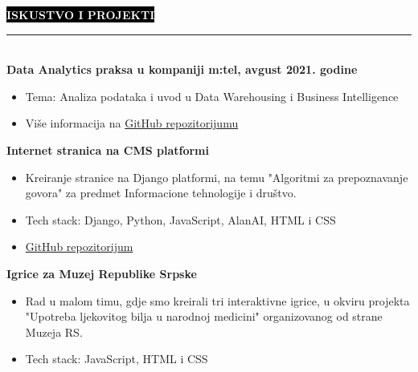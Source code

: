 \documentclass[9pt]{developercv} %
\begin{document}
\colorbox{black}{{\textcolor{white}{\textbf{\MakeUppercase{Iskustvo i projekti}}}}}
\par\noindent\rule{\textwidth}{2px}\\

    {\textbf{Data Analytics praksa u kompaniji m:tel, avgust 2021. godine}}
	\begin{itemize}
	    \item Tema: Analiza podataka i uvod u Data Warehousing i Business Intelligence
        \item [\faExternalLink] Više informacija na {\href{https://github.com/vladocodes/data-analytics-internship}{GitHub repozitorijumu}}\\

    \end{itemize}

\begin{minipage}[t]{0.45\textwidth}
	\vspace{-\baselineskip}
	
	{\textbf{Internet stranica na CMS platformi}}
	\begin{itemize}
        \item Kreiranje stranice na Django platformi, na temu "Algoritmi za prepoznavanje govora" za predmet Informacione tehnologije i društvo.
        \item Tech stack: Django, Python, JavaScript, AlanAI, HTML i CSS
        
        \item [\faExternalLink]{\href{https://github.com/vladocodes/PMF_ITAS_CMS}{GitHub repozitorijum}}
    \end{itemize}
\end{minipage}
\hfill
\begin{minipage}[t]{0.45\textwidth}
    \vspace{-\baselineskip}
    
    {\textbf{Igrice za Muzej Republike Srpske}}
    \begin{itemize}
        \item Rad u malom timu, gdje smo kreirali tri interaktivne igrice, u okviru projekta "Upotreba ljekovitog bilja u narodnoj medicini" organizovanog od strane Muzeja RS.
        \item  Tech stack: JavaScript, HTML i CSS
    \end{itemize}
\end{minipage}

\vspace{0.7cm}
\end{document}
